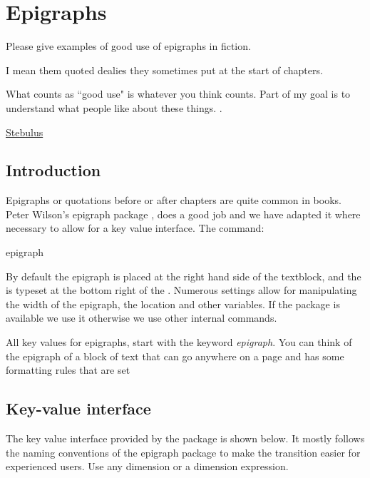 

\chapter{Epigraphs}
\label{c:epigraphs}

\epigraph{Please give examples of good use of epigraphs in fiction.

I mean them quoted dealies they sometimes put at the start of chapters.

What counts as ``good use" is whatever you think counts. Part of my goal is to understand what people like about these things.
.}{\href{http://ask.metafilter.com/207423/Good-use-of-epigraphs-in-fiction}{Stebulus}}



\section{Introduction}

Epigraphs or quotations before or after chapters are quite common in books. Peter Wilson's epigraph package \citep{epigraph}, 
does a good job and we have adapted it where necessary to allow for a key value interface. The command:


\begin{docCommand}{epigraph}{ }{ }
\end{docCommand}

By default the epigraph is placed at the right
hand side of the textblock, and the  is typeset at the bottom right of the . 
Numerous settings allow for manipulating the width of the epigraph, the location and other 
variables. If the package is available we use it otherwise we use other internal commands.

All key values for epigraphs, start with the keyword \emph{epigraph}. You can think of the epigraph of a block of text that can go anywhere on a page and has some formatting rules that are set 

\section{Key-value interface}
The key value interface provided by the package is shown below. It mostly follows the 
naming conventions of the epigraph package to make the transition easier for experienced users. Use any dimension or a dimension expression.
\medskip

